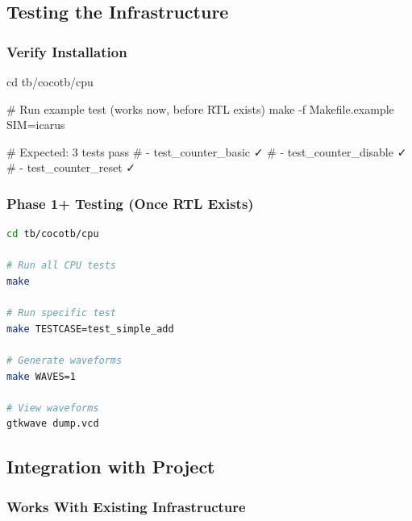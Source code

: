 \subsection{Testing the Infrastructure}\label{cr:app:archive-cocotb-setup-summary:testing-the-infrastructure}

\subsubsection{Verify Installation}\label{cr:app:archive-cocotb-setup-summary:verify-installation}

\begin{record}

\begin{textblock}
cd tb/cocotb/cpu

# Run example test (works now, before RTL exists)
make -f Makefile.example SIM=icarus

# Expected: 3 tests pass
# - test_counter_basic ✓
# - test_counter_disable ✓
# - test_counter_reset ✓
\end{textblock}

\end{record}

\subsubsection{Phase 1+ Testing (Once RTL Exists)}\label{cr:app:archive-cocotb-setup-summary:phase-1-testing-once-rtl-exists}

\begin{record}

\begin{lstlisting}[language=bash]
cd tb/cocotb/cpu

# Run all CPU tests
make

# Run specific test
make TESTCASE=test_simple_add

# Generate waveforms
make WAVES=1

# View waveforms
gtkwave dump.vcd
\end{lstlisting}

\end{record}

\subsection{Integration with Project}\label{cr:app:archive-cocotb-setup-summary:integration-with-project}

\subsubsection{Works With Existing Infrastructure}\label{cr:app:archive-cocotb-setup-summary:works-with-existing-infrastructure}

